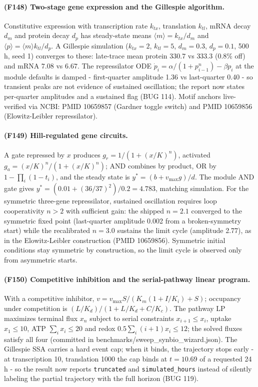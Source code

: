 \paragraph{(F148) Two-stage gene expression and the Gillespie algorithm.} Constitutive expression with transcription rate $k_{tx}$, translation $k_{tl}$, mRNA decay $d_m$ and protein decay $d_p$ has steady-state means $\langle m\rangle=k_{tx}/d_m$ and $\langle p\rangle=\langle m\rangle k_{tl}/d_p$. A Gillespie simulation ($k_{tx}=2$, $k_{tl}=5$, $d_m=0.3$, $d_p=0.1$, 500 h, seed 1) converges to these: late-trace mean protein $330.7$ vs $333.3$ (0.8\% off) and mRNA $7.08$ vs $6.67$. The repressilator ODE $\dot p_i=\alpha/(1+p_{i-1}^{n})-\beta p_i$ at the module defaults is damped - first-quarter amplitude 1.36 vs last-quarter 0.40 - so transient peaks are not evidence of sustained oscillation; the report now states per-quarter amplitudes and a sustained flag (BUG 114). Motif anchors live-verified via NCBI: PMID 10659857 (Gardner toggle switch) and PMID 10659856 (Elowitz-Leibler repressilator).
\paragraph{(F149) Hill-regulated gene circuits.} A gate repressed by $x$ produces $g_r=1/(1+(x/K)^n)$, activated $g_a=(x/K)^n/(1+(x/K)^n)$; AND combines by product, OR by $1-\prod_i(1-t_i)$, and the steady state is $y^*=(b+v_{\max}g)/d$. The module AND gate gives $y^*=(0.01+(36/37)^2)/0.2=4.783$, matching simulation. For the symmetric three-gene repressilator, sustained oscillation requires loop cooperativity $n>2$ with sufficient gain: the shipped $n=2.1$ converged to the symmetric fixed point (last-quarter amplitude 0.002 from a broken-symmetry start) while the recalibrated $n=3.0$ sustains the limit cycle (amplitude 2.77), as in the Elowitz-Leibler construction (PMID 10659856). Symmetric initial conditions stay symmetric by construction, so the limit cycle is observed only from asymmetric starts.
\paragraph{(F150) Competitive inhibition and the serial-pathway linear program.} With a competitive inhibitor, $v=v_{\max}S/(K_m(1+I/K_i)+S)$; occupancy under competition is $(L/K_d)/(1+L/K_d+C/K_c)$. The pathway LP maximizes terminal flux $x_n$ subject to serial constraints $x_{i+1}\le x_i$, uptake $x_1\le 10$, ATP $\sum_i x_i\le 20$ and redox $0.5\sum_i (i+1)x_i\le 12$; the solved fluxes satisfy all four (committed in benchmarks/sweep\_synbio\_wizard.json). The Gillespie SSA carries a hard event cap; when it binds, the trajectory stops early - at transcription 10, translation 1000 the cap binds at $t=10.69$ of a requested 24 h - so the result now reports \texttt{truncated} and \texttt{simulated\_hours} instead of silently labeling the partial trajectory with the full horizon (BUG 119).
